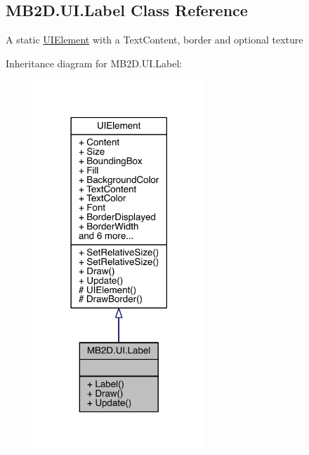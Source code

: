 \hypertarget{class_m_b2_d_1_1_u_i_1_1_label}{}\subsection{M\+B2\+D.\+U\+I.\+Label Class Reference}
\label{class_m_b2_d_1_1_u_i_1_1_label}


A static \hyperlink{class_m_b2_d_1_1_u_i_1_1_u_i_element}{U\+I\+Element} with a Text\+Content, border and optional texture  




Inheritance diagram for M\+B2\+D.\+U\+I.\+Label\+:
\nopagebreak
\begin{figure}[H]
\begin{center}
\leavevmode
\includegraphics[width=182pt]{class_m_b2_d_1_1_u_i_1_1_label__inherit__graph}
\end{center}
\end{figure}



